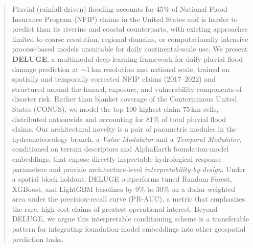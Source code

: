 
\begin{abstract}

Pluvial (rainfall-driven) flooding accounts for 45\% of National Flood Insurance Program (NFIP) claims in the United States and is harder to predict than its riverine and coastal counterparts, with existing approaches limited to coarse resolution, regional domains, or computationally intensive process-based models unsuitable for daily continental-scale use.
%
We present \textbf{DELUGE}, a multimodal deep learning framework for daily pluvial flood damage prediction at ${\sim}1$\,km resolution and national scale, trained on spatially and temporally corrected NFIP claims (2017--2022) and structured around the hazard, exposure, and vulnerability components of disaster risk.
%
Rather than blanket coverage of the Conterminous United States (CONUS), we model the top 100 highest-claim 75\,km cells, distributed nationwide and accounting for \tsim$81\%$ of total pluvial flood claims.
%
Our architectural novelty is a pair of parametric modules in the hydrometeorology branch, a \emph{Value Modulator} and a \emph{Temporal Modulator}, conditioned on terrain descriptors and AlphaEarth foundation-model embeddings, that expose directly inspectable hydrological response parameters and provide architecture-level \emph{interpretability-by-design}.
%
Under a spatial block holdout, DELUGE outperforms tuned Random Forest, XGBoost, and LightGBM baselines by 9\% to 30\% on a dollar-weighted area under the precision-recall curve (PR-AUC), a metric that emphasizes the rare, high-cost claims of greatest operational interest.
%
Beyond DELUGE, we argue this interpretable conditioning scheme is a transferable pattern for integrating foundation-model embeddings into other geospatial prediction tasks.
%
\end{abstract}
